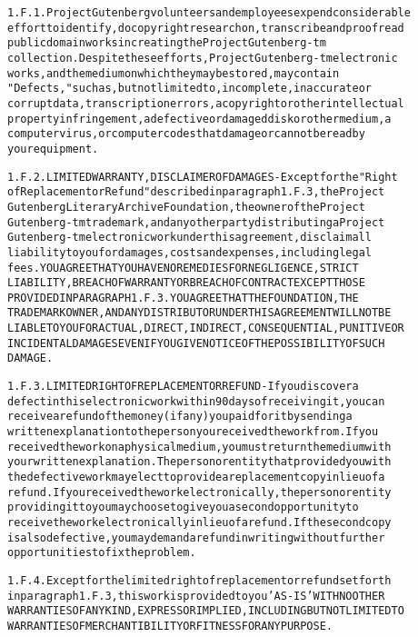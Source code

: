 \documentclass[12pt,oneside]{book}[2007/10/19]
\newenvironment{PGtext}{%
  \begin{alltt}
  \fontsize{9}{10}\ttfamily\selectfont}%
  {\end{alltt}%
}
\begin{document}
\begin{PGtext}
1.F.1.  Project Gutenberg volunteers and employees expend considerable
effort to identify, do copyright research on, transcribe and proofread
public domain works in creating the Project Gutenberg-tm
collection.  Despite these efforts, Project Gutenberg-tm electronic
works, and the medium on which they may be stored, may contain
"Defects," such as, but not limited to, incomplete, inaccurate or
corrupt data, transcription errors, a copyright or other intellectual
property infringement, a defective or damaged disk or other medium, a
computer virus, or computer codes that damage or cannot be read by
your equipment.

1.F.2.  LIMITED WARRANTY, DISCLAIMER OF DAMAGES - Except for the "Right
of Replacement or Refund" described in paragraph 1.F.3, the Project
Gutenberg Literary Archive Foundation, the owner of the Project
Gutenberg-tm trademark, and any other party distributing a Project
Gutenberg-tm electronic work under this agreement, disclaim all
liability to you for damages, costs and expenses, including legal
fees.  YOU AGREE THAT YOU HAVE NO REMEDIES FOR NEGLIGENCE, STRICT
LIABILITY, BREACH OF WARRANTY OR BREACH OF CONTRACT EXCEPT THOSE
PROVIDED IN PARAGRAPH 1.F.3.  YOU AGREE THAT THE FOUNDATION, THE
TRADEMARK OWNER, AND ANY DISTRIBUTOR UNDER THIS AGREEMENT WILL NOT BE
LIABLE TO YOU FOR ACTUAL, DIRECT, INDIRECT, CONSEQUENTIAL, PUNITIVE OR
INCIDENTAL DAMAGES EVEN IF YOU GIVE NOTICE OF THE POSSIBILITY OF SUCH
DAMAGE.

1.F.3.  LIMITED RIGHT OF REPLACEMENT OR REFUND - If you discover a
defect in this electronic work within 90 days of receiving it, you can
receive a refund of the money (if any) you paid for it by sending a
written explanation to the person you received the work from.  If you
received the work on a physical medium, you must return the medium with
your written explanation.  The person or entity that provided you with
the defective work may elect to provide a replacement copy in lieu of a
refund.  If you received the work electronically, the person or entity
providing it to you may choose to give you a second opportunity to
receive the work electronically in lieu of a refund.  If the second copy
is also defective, you may demand a refund in writing without further
opportunities to fix the problem.

1.F.4.  Except for the limited right of replacement or refund set forth
in paragraph 1.F.3, this work is provided to you 'AS-IS' WITH NO OTHER
WARRANTIES OF ANY KIND, EXPRESS OR IMPLIED, INCLUDING BUT NOT LIMITED TO
WARRANTIES OF MERCHANTIBILITY OR FITNESS FOR ANY PURPOSE.


\end{PGtext}
\end{document}
